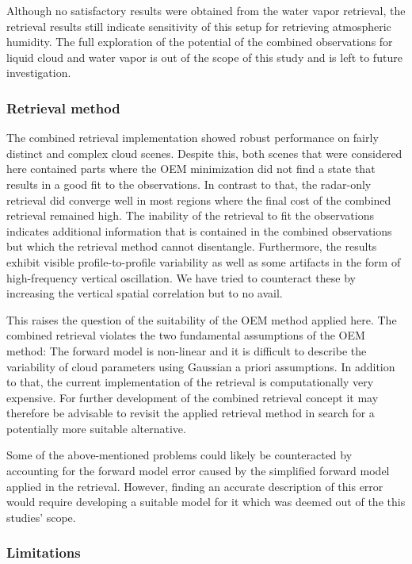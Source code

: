 \documentclass[journal abbreviation, manuscript]{copernicus}
\begin{document}
Although no satisfactory results were obtained from the water vapor retrieval,
the retrieval results still indicate sensitivity of this setup for retrieving
atmospheric humidity. The full exploration of the potential of the combined
observations for liquid cloud and water vapor is out of the scope of this study
and is left to future investigation.

\subsubsection{Retrieval method}

The combined retrieval implementation showed robust performance on fairly
distinct and complex cloud scenes. Despite this, both scenes that were
considered here contained parts where the OEM minimization did not find a state
that results in a good fit to the observations. In contrast to that, the
radar-only retrieval did converge well in most regions where the final cost of
the combined retrieval remained high. The inability of the retrieval to fit the
observations indicates additional information that is contained in the combined
observations but which the retrieval method cannot disentangle. Furthermore, the
results exhibit visible profile-to-profile variability as well as some artifacts
in the form of high-frequency vertical oscillation. We have tried to counteract
these by increasing the vertical spatial correlation but to no avail.

This raises the question of the suitability of the OEM method applied here. The
combined retrieval violates the two fundamental assumptions of the OEM method:
The forward model is non-linear and it is difficult to describe the variability
of cloud parameters using Gaussian a priori assumptions. In addition to that,
the current implementation of the retrieval is computationally very expensive.
For further development of the combined retrieval concept it may therefore be
advisable to revisit the applied retrieval method in search for a potentially
more suitable alternative.

Some of the above-mentioned problems could likely be counteracted by accounting
for the forward model error caused by the simplified forward model applied in
the retrieval. However, finding an accurate description of this error
would require developing a suitable model for it which was deemed out of the
this studies' scope.

\subsubsection{Limitations}
\end{document}
